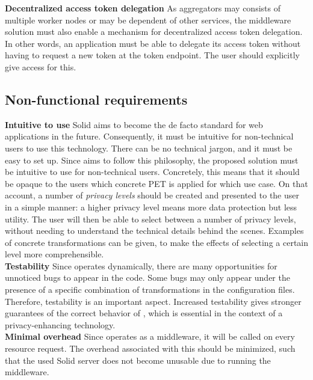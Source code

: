 \noindent \textbf{Decentralized access token delegation} As aggregators may consists of multiple worker nodes or may be dependent of other services, the middleware solution must also enable a mechanism for decentralized access token delegation. In other words, an application must be able to delegate its access token without having to request a new token at the token endpoint. The user should explicitly give access for this.

\subsection{Non-functional requirements}
\textbf{Intuitive to use} Solid aims to become the de facto standard for web applications in the future. Consequently, it must be intuitive for non-technical users to use this technology. There can be no technical jargon, and it must be easy to set up. Since \middleware{} aims to follow this philosophy, the proposed solution must be intuitive to use for non-technical users.  Concretely, this means that it should be opaque to the users which concrete PET is applied for which use case. On that account, a number of \textit{privacy levels} should be created and presented to the user in a simple manner: a higher privacy level means more data protection but less utility. The user will then be able to select between a number of privacy levels, without needing to understand the technical details behind the scenes. Examples of concrete transformations can be given, to make the effects of selecting a certain level more comprehensible. \\

\noindent \textbf{Testability} Since \middleware{} operates dynamically, there are many opportunities for unnoticed bugs to appear in the code. Some bugs may only appear under the presence of a specific combination of transformations in the configuration files. Therefore, testability is an important aspect. Increased testability gives stronger guarantees of the correct behavior of \middleware{}, which is essential in the context of a privacy-enhancing technology. \\

\noindent \textbf{Minimal overhead} Since \middleware{} operates as a middleware, it will be called on every resource request. The overhead associated with this should be minimized, such that the used Solid server does not become unusable due to running the middleware.

